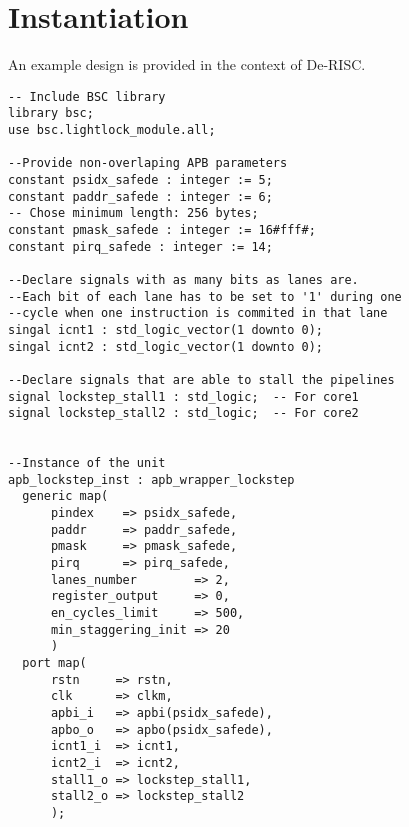 \section{Instantiation}
An example design is provided in the context of De-RISC.
\\
\belowcaptionskip=-10pt
\begin{lstlisting}[label=ins-prot,caption=SafePMU instance example for gpp\_sys,style=vhdl]
-- Include BSC library
library bsc;
use bsc.lightlock_module.all;

--Provide non-overlaping APB parameters
constant psidx_safede : integer := 5;
constant paddr_safede : integer := 6;
-- Chose minimum length: 256 bytes;
constant pmask_safede : integer := 16#fff#;  
constant pirq_safede : integer := 14;

--Declare signals with as many bits as lanes are.
--Each bit of each lane has to be set to '1' during one 
--cycle when one instruction is commited in that lane
singal icnt1 : std_logic_vector(1 downto 0);
singal icnt2 : std_logic_vector(1 downto 0);

--Declare signals that are able to stall the pipelines
signal lockstep_stall1 : std_logic;  -- For core1
signal lockstep_stall2 : std_logic;  -- For core2


--Instance of the unit
apb_lockstep_inst : apb_wrapper_lockstep
  generic map(
      pindex    => psidx_safede,
      paddr     => paddr_safede,            
      pmask     => pmask_safede,
      pirq      => pirq_safede,
      lanes_number        => 2,
      register_output     => 0,
      en_cycles_limit     => 500,
      min_staggering_init => 20
      )
  port map(
      rstn     => rstn,
      clk      => clkm,
      apbi_i   => apbi(psidx_safede),
      apbo_o   => apbo(psidx_safede),
      icnt1_i  => icnt1, 
      icnt2_i  => icnt2, 
      stall1_o => lockstep_stall1,
      stall2_o => lockstep_stall2
      );

\end{lstlisting}



